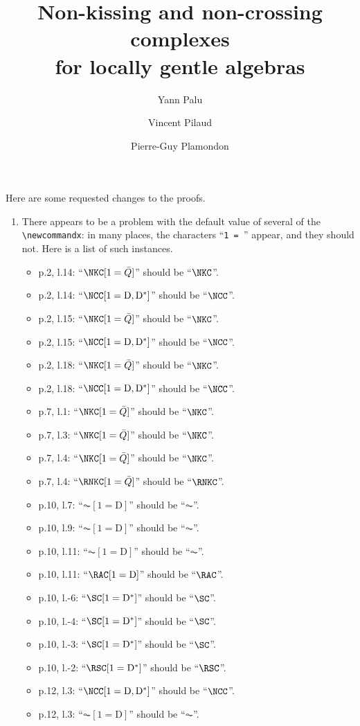 \documentclass{amsart}
\title[Non-kissing and non-crossing complexes for locally gentle algebras]{Non-kissing and non-crossing complexes \\ for locally gentle algebras}
\author{Yann Palu}
\author{Vincent Pilaud}
\author{Pierre-Guy Plamondon}
\theoremstyle{definition}
\newcommand{\dual}{^*} %
\newcommand{\dissection}{\mathrm{D}} %
\begin{document}
Here are some requested changes to the proofs.

\begin{enumerate}
 \item There appears to be a problem with the default value of several of the \verb|\newcommandx|: in many places, the characters ``\verb|1 = |'' appear, and they should not.  Here is a list of such instances.
   \begin{itemize}
    \item p.2, l.14: ``$\NKC[1=\bar Q]$'' should be ``$\NKC$''.
    \item p.2, l.14: ``$\NCC[1=\dissection,\dissection\dual]$'' should be ``$\NCC$''.
    \item p.2, l.15: ``$\NKC[1=\bar Q]$'' should be ``$\NKC$''.
    \item p.2, l.15: ``$\NCC[1=\dissection,\dissection\dual]$'' should be ``$\NCC$''.
    \item p.2, l.18: ``$\NKC[1=\bar Q]$'' should be ``$\NKC$''.
    \item p.2, l.18: ``$\NCC[1=\dissection,\dissection\dual]$'' should be ``$\NCC$''.
    \item p.7, l.1: ``$\NKC[1=\bar Q]$'' should be ``$\NKC$''.
    \item p.7, l.3: ``$\NKC[1=\bar Q]$'' should be ``$\NKC$''.
    \item p.7, l.4: ``$\NKC[1=\bar Q]$'' should be ``$\NKC$''.
    \item p.7, l.4: ``$\RNKC[1=\bar Q]$'' should be ``$\RNKC$''.
    \item p.10, l.7: ``$\AC[1=\dissection]$'' should be ``$\AC$''.
    \item p.10, l.9: ``$\AC[1=\dissection]$'' should be ``$\AC$''.
    \item p.10, l.11: ``$\AC[1=\dissection]$'' should be ``$\AC$''.
    \item p.10, l.11: ``$\RAC[1=\dissection]$'' should be ``$\RAC$''.
    \item p.10, l.-6: ``$\SC[1=\dissection\dual]$'' should be ``$\SC$''.
    \item p.10, l.-4: ``$\SC[1=\dissection\dual]$'' should be ``$\SC$''.
    \item p.10, l.-3: ``$\SC[1=\dissection\dual]$'' should be ``$\SC$''.
    \item p.10, l.-2: ``$\RSC[1=\dissection\dual]$'' should be ``$\RSC$''.
    \item p.12, l.3: ``$\NCC[1=\dissection,\dissection\dual]$'' should be ``$\NCC$''.
    \item p.12, l.3: ``$\AC[1=\dissection]$'' should be ``$\AC$''.

\end{itemize}
\end{enumerate}
\end{document}
